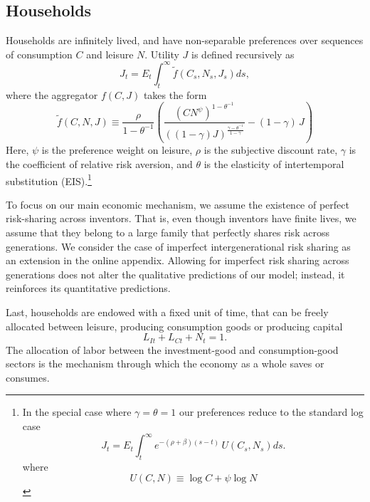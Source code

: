 \documentclass[12pt]{article}
\begin{document}
\subsection{Households}


Households are infinitely lived, and have  non-separable preferences over sequences of consumption $C$ and leisure $N$. Utility $J$ is defined recursively as
\begin{equation}\label{eqn:PREFERENCES}
J_t=E_t \int_t^\infty \tilde f(C_s, N_s, J_s) ds,
\end{equation}
where the aggregator $f(C,J)$ takes the form
\begin{equation}
\tilde f(C,N,J)\equiv \frac{\rho}{1-\theta^{-1}}\left(\frac{ \left(C N^\psi\right) ^{1-\theta^{-1}}}{ ((1-\gamma) J)^{\frac{\gamma-\theta^{-1}}{1-\gamma} }}-(1-\gamma)\,J\right)
\end{equation}
Here, $\psi$ is the preference weight on leisure, $\rho$ is the subjective discount rate, $\gamma$ is the coefficient of relative risk aversion, and $\theta$ is the elasticity of intertemporal substitution (EIS).\footnote{In the special case where $\gamma=\theta=1$  our preferences reduce to the standard log case
\begin{equation}\label{eqn:PREFERENCESlog}
J_t=E_t \int_t^\infty e^{-(\rho+\beta)(s-t)} \, U(C_s, N_s)ds.
\end{equation}
where
\begin{equation}
U(C,N) \equiv \log C + \psi \log N
\end{equation}
}

To focus on our main economic mechanism,  we assume the existence of perfect risk-sharing across inventors. That is, even though inventors have finite lives, we assume that they belong to a large family that perfectly shares risk across generations. We consider the case of imperfect intergenerational risk sharing as an extension in the online appendix. Allowing for imperfect risk sharing across generations does not alter the qualitative predictions of our model; instead, it reinforces its quantitative predictions.

Last, households are endowed with a fixed unit of time, that can be freely allocated between leisure, producing consumption goods or producing capital
\begin{equation}\label{eqn:labor_market}
L_{It} + L_{Ct} + N_t= 1.
\end{equation}
The allocation of labor between the investment-good and consumption-good sectors is the mechanism through which the economy as a whole saves or consumes.
\end{document}
